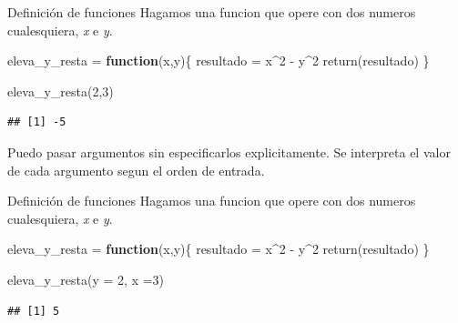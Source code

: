\documentclass[
  10pt,
  ignorenonframetext,
]{beamer}
\newenvironment{Shaded}{\begin{snugshade}}{\end{snugshade}}
\newcommand{\AttributeTok}[1]{\textcolor[rgb]{0.77,0.63,0.00}{#1}}
\newcommand{\ControlFlowTok}[1]{\textcolor[rgb]{0.13,0.29,0.53}{\textbf{#1}}}
\newcommand{\DecValTok}[1]{\textcolor[rgb]{0.00,0.00,0.81}{#1}}
\newcommand{\FunctionTok}[1]{\textcolor[rgb]{0.00,0.00,0.00}{#1}}
\newcommand{\NormalTok}[1]{#1}
\newcommand{\OtherTok}[1]{\textcolor[rgb]{0.56,0.35,0.01}{#1}}
\newcommand{\SpecialCharTok}[1]{\textcolor[rgb]{0.00,0.00,0.00}{#1}}
\begin{document}
\begin{frame}[fragile]{Definición de funciones}
\protect\hypertarget{definiciuxf3n-de-funciones-2}{}
Hagamos una funcion que opere con dos numeros cualesquiera, \emph{x} e
\emph{y}. \vspace{15pt}

\begin{Shaded}
\begin{Highlighting}[]
\NormalTok{eleva\_y\_resta }\OtherTok{=} \ControlFlowTok{function}\NormalTok{(x,y)\{}
\NormalTok{  resultado }\OtherTok{=}\NormalTok{ x}\SpecialCharTok{\^{}}\DecValTok{2} \SpecialCharTok{{-}}\NormalTok{ y}\SpecialCharTok{\^{}}\DecValTok{2}
  \FunctionTok{return}\NormalTok{(resultado)}
\NormalTok{\}}

\FunctionTok{eleva\_y\_resta}\NormalTok{(}\DecValTok{2}\NormalTok{,}\DecValTok{3}\NormalTok{)}
\end{Highlighting}
\end{Shaded}

\begin{verbatim}
## [1] -5
\end{verbatim}

\vspace{15pt}

Puedo pasar argumentos sin especificarlos explicitamente. Se interpreta
el valor de cada argumento segun el orden de entrada.
\end{frame}

\begin{frame}[fragile]{Definición de funciones}
\protect\hypertarget{definiciuxf3n-de-funciones-3}{}
Hagamos una funcion que opere con dos numeros cualesquiera, \emph{x} e
\emph{y}. \vspace{15pt}

\begin{Shaded}
\begin{Highlighting}[]
\NormalTok{eleva\_y\_resta }\OtherTok{=} \ControlFlowTok{function}\NormalTok{(x,y)\{}
\NormalTok{  resultado }\OtherTok{=}\NormalTok{ x}\SpecialCharTok{\^{}}\DecValTok{2} \SpecialCharTok{{-}}\NormalTok{ y}\SpecialCharTok{\^{}}\DecValTok{2}
  \FunctionTok{return}\NormalTok{(resultado)}
\NormalTok{\}}

\FunctionTok{eleva\_y\_resta}\NormalTok{(}\AttributeTok{y =} \DecValTok{2}\NormalTok{, }\AttributeTok{x =}\DecValTok{3}\NormalTok{)}
\end{Highlighting}
\end{Shaded}

\begin{verbatim}
## [1] 5
\end{verbatim}
\end{frame}
\end{document}
